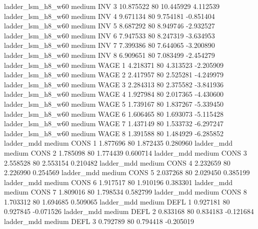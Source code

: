   ladder_lsm_h8_w60     medium      INV                 3 10.875522 80      10.445929           4.112539
  ladder_lsm_h8_w60     medium      INV                 4  9.671134 80       9.754181          -0.851404
  ladder_lsm_h8_w60     medium      INV                 5  8.687292 80       8.949746          -2.932527
  ladder_lsm_h8_w60     medium      INV                 6  7.947533 80       8.247319          -3.634953
  ladder_lsm_h8_w60     medium      INV                 7  7.399386 80       7.644065          -3.200890
  ladder_lsm_h8_w60     medium      INV                 8  6.909651 80       7.083499          -2.454279
  ladder_lsm_h8_w60     medium     WAGE                 1  4.218371 80       4.313523          -2.205909
  ladder_lsm_h8_w60     medium     WAGE                 2  2.417957 80       2.525281          -4.249979
  ladder_lsm_h8_w60     medium     WAGE                 3  2.284313 80       2.375582          -3.841936
  ladder_lsm_h8_w60     medium     WAGE                 4  1.927984 80       2.017365          -4.430600
  ladder_lsm_h8_w60     medium     WAGE                 5  1.739167 80       1.837267          -5.339450
  ladder_lsm_h8_w60     medium     WAGE                 6  1.606465 80       1.693073          -5.115428
  ladder_lsm_h8_w60     medium     WAGE                 7  1.437149 80       1.533732          -6.297247
  ladder_lsm_h8_w60     medium     WAGE                 8  1.391588 80       1.484929          -6.285852
         ladder_mdd     medium     CONS                 1  1.877696 80       1.872435           0.280960
         ladder_mdd     medium     CONS                 2  1.785098 80       1.774439           0.600714
         ladder_mdd     medium     CONS                 3  2.558528 80       2.553154           0.210482
         ladder_mdd     medium     CONS                 4  2.232659 80       2.226990           0.254569
         ladder_mdd     medium     CONS                 5  2.037268 80       2.029450           0.385199
         ladder_mdd     medium     CONS                 6  1.917517 80       1.910196           0.383301
         ladder_mdd     medium     CONS                 7  1.809016 80       1.798534           0.582799
         ladder_mdd     medium     CONS                 8  1.703312 80       1.694685           0.509065
         ladder_mdd     medium     DEFL                 1  0.927181 80       0.927845          -0.071526
         ladder_mdd     medium     DEFL                 2  0.833168 80       0.834183          -0.121684
         ladder_mdd     medium     DEFL                 3  0.792789 80       0.794418          -0.205019

